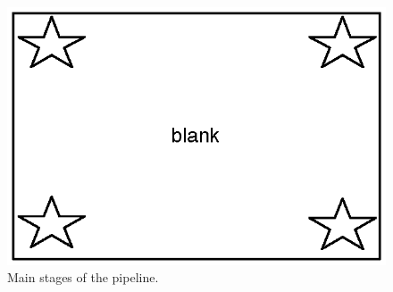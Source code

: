 \begin{figure}
\begin{centering}
\includegraphics{figs/blank.eps}
\caption{Main stages of the \ix pipeline.}
\label{fig:mainloop}
\end{centering}
\end{figure}


